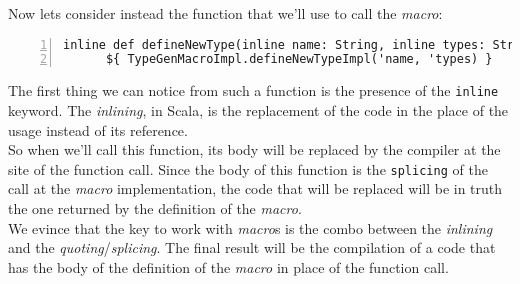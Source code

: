 Now lets consider instead the function that we'll use to call the \textit{macro}:\\
\begin{minipage}{\linewidth}
  \begin{lstlisting}[numbers=left, numberstyle=\tiny, numbersep=-5pt, stepnumber=1]
    inline def defineNewType(inline name: String, inline types: String*): Any = 
      ${ TypeGenMacroImpl.defineNewTypeImpl('name, 'types) }
  \end{lstlisting}
\end{minipage}
The first thing we can notice from such a function is the presence of the \texttt{inline} keyword.
The \textit{inlining}, in Scala, is the replacement of the code in the place of the usage instead of its reference.\\
So when we'll call this function, its body will be replaced by the compiler at the site of the function call.
Since the body of this function is the \texttt{splicing} of the call at the \textit{macro} implementation, the code that will be replaced will be in truth the one returned by the definition of the \textit{macro}.\\
We evince that the key to work with \textit{macro}s is the combo between the \textit{inlining} and the \textit{quoting}/\textit{splicing}.
The final result will be the compilation of a code that has the body of the definition of the \textit{macro} in place of the function call.\\

